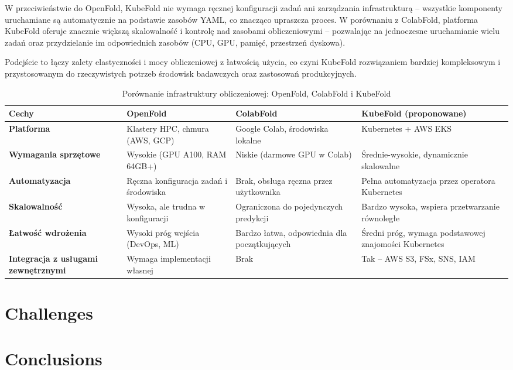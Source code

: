 W przeciwieństwie do OpenFold, KubeFold nie wymaga ręcznej konfiguracji zadań ani zarządzania infrastrukturą – wszystkie komponenty uruchamiane są automatycznie na podstawie zasobów YAML, co znacząco upraszcza proces.
W porównaniu z ColabFold, platforma KubeFold oferuje znacznie większą skalowalność i kontrolę nad zasobami obliczeniowymi – pozwalając na jednoczesne uruchamianie wielu zadań oraz przydzielanie im odpowiednich zasobów (CPU, GPU, pamięć, przestrzeń dyskowa).

Podejście to łączy zalety elastyczności i mocy obliczeniowej z łatwością użycia, co czyni KubeFold rozwiązaniem bardziej kompleksowym i przystosowanym do rzeczywistych potrzeb środowisk badawczych oraz zastosowań produkcyjnych.

\begin{table}[H]
    \centering
    \begin{tabular}{|p{4cm}|p{3.7cm}|p{3.7cm}|p{3.7cm}|}
        \hline
        \textbf{Cechy}                              & \textbf{OpenFold}                      & \textbf{ColabFold}                           & \textbf{KubeFold (proponowane)}                       \\
        \hline
        \textbf{Platforma}                          & Klastery HPC, chmura (AWS, GCP)        & Google Colab, środowiska lokalne & Kubernetes + AWS EKS \\
        \hline
        \textbf{Wymagania sprzętowe}                & Wysokie (GPU A100, RAM 64GB+)          & Niskie (darmowe GPU w Colab) & Średnie-wysokie, dynamicznie skalowalne \\
        \hline
        \textbf{Automatyzacja}                      & Ręczna konfiguracja zadań i środowiska & Brak, obsługa ręczna przez użytkownika & Pełna automatyzacja przez operatora Kubernetes \\
        \hline
        \textbf{Skalowalność}                       & Wysoka, ale trudna w konfiguracji      & Ograniczona do pojedynczych predykcji & Bardzo wysoka, wspiera przetwarzanie równoległe \\
        \hline
        \textbf{Łatwość wdrożenia}                  & Wysoki próg wejścia (DevOps, ML)       & Bardzo łatwa, odpowiednia dla początkujących & Średni próg, wymaga podstawowej znajomości Kubernetes \\
        \hline
        \textbf{Integracja z usługami zewnętrznymi} & Wymaga implementacji własnej           & Brak                                         & Tak – AWS S3, FSx, SNS, IAM                           \\
        \hline
    \end{tabular}
    \caption{Porównanie infrastruktury obliczeniowej: OpenFold, ColabFold i KubeFold}
\end{table}

\section{Challenges}


\section{Conclusions}